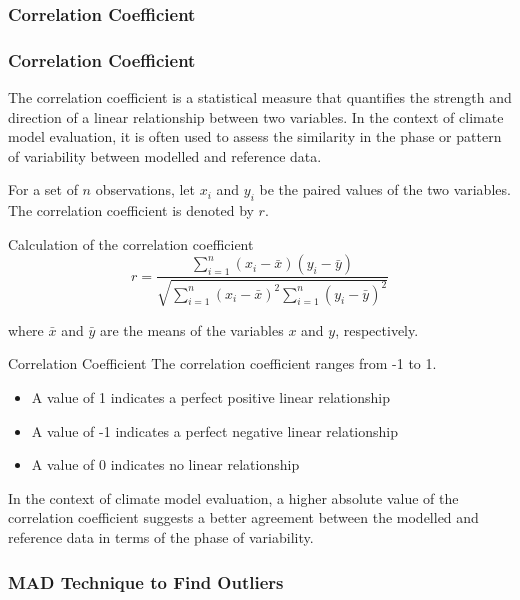 \documentclass[xcolor={dvipsnames}]{beamer}
\begin{document}
\subsubsection{Correlation Coefficient}

\begin{frame}
\frametitle{Correlation Coefficient}

The correlation coefficient is a statistical measure that quantifies the strength and direction of a linear relationship between two variables. In the context of climate model evaluation, it is often used to assess the similarity in the phase or pattern of variability between modelled and reference data.

\pause

\hfill

For a set of $n$ observations, let $x_i$ and $y_i$ be the paired values of the two variables. The correlation coefficient is denoted by $r$.

\begin{alertblock}{Calculation of the correlation coefficient}
\[
r = \frac{\sum_{i=1}^{n} (x_i - \bar{x})(y_i - \bar{y})}{\sqrt{\sum_{i=1}^{n} (x_i - \bar{x})^2 \sum_{i=1}^{n} (y_i - \bar{y})^2}}
\]
\end{alertblock}

where $\bar{x}$ and $\bar{y}$ are the means of the variables $x$ and $y$, respectively.

\end{frame}

\begin{frame}{Correlation Coefficient}
The correlation coefficient ranges from -1 to 1. 

\begin{itemize}
    \item A value of 1 indicates a perfect positive linear relationship
    \item A value of -1 indicates a perfect negative linear relationship
    \item A value of 0 indicates no linear relationship
\end{itemize}

\hfill

In the context of climate model evaluation, a higher absolute value of the correlation coefficient suggests a better agreement between the modelled and reference data in terms of the phase of variability.

\end{frame}

\subsubsection{MAD Technique to Find Outliers}
\end{document}
